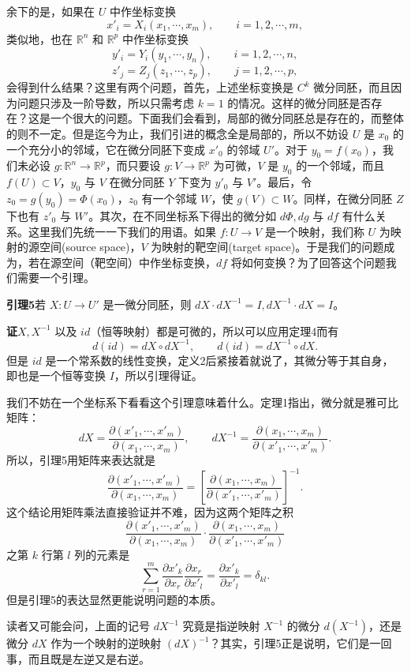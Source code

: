 余下的是，如果在 $U$ 中作坐标变换
\[
 x'_i=X_i(x_1,\cdots,x_m),\qquad i=1,2,\cdots,m,
\]
类似地，也在 $\mathbb R^n$ 和 $\mathbb R^p$ 中作坐标变换
\[
 y'_i=Y_i(y_1,\cdots,y_n),\qquad i=1,2,\cdots,n,
\]
\[
 z'_j=Z_j(z_1,\cdots,z_p),\qquad j=1,2,\cdots,p,
\]
会得到什么结果？这里有两个问题，首先，上述坐标变换是 $C^k$ 微分同胚，而且因为问题只涉及一阶导数，所以只需考虑 $k=1$ 的情况。这样的微分同胚是否存在？这是一个很大的问题。下面我们会看到，局部的微分同胚总是存在的，而整体的则不一定。但是迄今为止，我们引进的概念全是局部的，所以不妨设 $U$ 是 $x_0$ 的一个充分小的邻域，它在微分同胚下变成 $x'_0$ 的邻域 $U'$。对于 $y_0=f(x_0)$，我们未必设 $g:\mathbb R^n\to\mathbb R^p$，而只要设 $g:V\to\mathbb R^p$ 为可微，$V$ 是 $y_0$ 的一个邻域，而且 $f(U)\subset V$，$y_0$ 与 $V$ 在微分同胚 $Y$ 下变为 $y'_0$ 与 $V'$。最后，令 $z_0=g(y_0)=\Phi(x_0)$，$z_0$ 有一个邻域 $W$，使 $g(V)\subset W$。同样，在微分同胚 $Z$ 下也有 $z'_0$ 与 $W'$。其次，在不同坐标系下得出的微分如 $d\Phi,dg$ 与 $df$ 有什么关系。这里我们先统一一下我们的用语。如果 $f:U\to V$ 是一个映射，我们称 $U$ 为映射的源空间(source space)，$V$ 为映射的靶空间(target space)。于是我们的问题成为，若在源空间（靶空间）中作坐标变换，$df$ 将如何变换？为了回答这个问题我们需要一个引理。

\noindent\textbf{引理5}\quad 若 $X:U\to U'$ 是一微分同胚，则 $dX\cdot dX^{-1}=I,dX^{-1}\cdot dX=I$。

\noindent\textbf{证}\quad $X,X^{-1}$ 以及 $id$（恒等映射）都是可微的，所以可以应用定理4而有
\[
 d(id)=dX\circ dX^{-1},\qquad d(id)=dX^{-1}\circ dX.
\]
但是 $id$ 是一个常系数的线性变换，定义2后紧接着就说了，其微分等于其自身，即也是一个恒等变换 $I$，所以引理得证。

我们不妨在一个坐标系下看看这个引理意味着什么。定理1指出，微分就是雅可比矩阵：
\[
 dX=\frac{\partial(x'_1,\cdots,x'_m)}{\partial(x_1,\cdots,x_m)},\qquad
 dX^{-1}=\frac{\partial(x_1,\cdots,x_m)}{\partial(x'_1,\cdots,x'_m)}.
\]
所以，引理5用矩阵来表达就是
\[
 \frac{\partial(x'_1,\cdots,x'_m)}{\partial(x_1,\cdots,x_m)}=
 \left[\frac{\partial(x_1,\cdots,x_m)}{\partial(x'_1,\cdots,x'_m)}\right]^{-1}.
\]
这个结论用矩阵乘法直接验证并不难，因为这两个矩阵之积
\[
 \frac{\partial(x'_1,\cdots,x'_m)}{\partial(x_1,\cdots,x_m)}
 \cdot
 \frac{\partial(x_1,\cdots,x_m)}{\partial(x'_1,\cdots,x'_m)}
\]
之第 $k$ 行第 $l$ 列的元素是
\[
 \sum_{r=1}^m\frac{\partial x'_k}{\partial x_r}\frac{\partial x_r}{\partial x'_l}
 =\frac{\partial x'_k}{\partial x'_l}=\delta_{kl}.
\]
但是引理5的表达显然更能说明问题的本质。

读者又可能会问，上面的记号 $dX^{-1}$ 究竟是指逆映射 $X^{-1}$ 的微分 $d(X^{-1})$，还是微分 $dX$ 作为一个映射的逆映射 $(dX)^{-1}$？其实，引理5正是说明，它们是一回事，而且既是左逆又是右逆。

